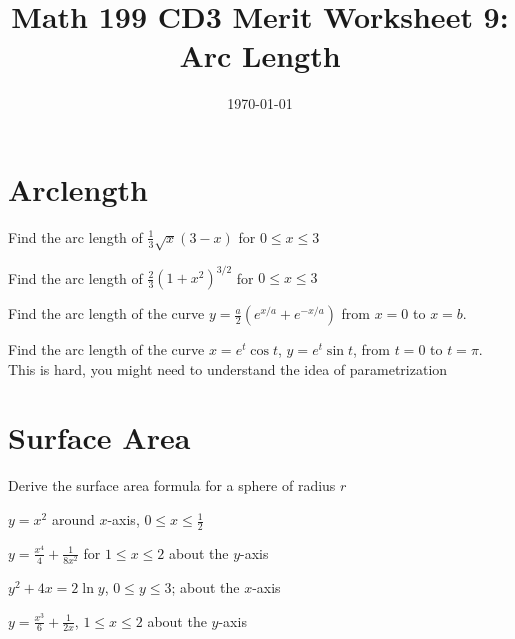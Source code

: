 
\usepackage{fullpage,amsmath,amssymb,amsthm}

\newcommand{\D}{\displaystyle}

\title{Math 199 CD3 Merit Worksheet 9: Arc Length}
\date{\today}




\maketitle
\section{Arclength}
\be
	\item Find the arc length of $\frac{1}{3}\sqrt{x}(3-x)$ for $0\leq x\leq 3$
	\vfill
	\item Find the arc length of $\frac{2}{3}(1+x^2)^{3/2}$ for $0\leq x\leq 3$
	\vfill
	\item Find the arc length of the curve $y=\frac{a}{2}(e^{x/a}+e^{-x/a})$ from $x=0$ to $x=b$.
	\vfill
	\item Find the arc length of the curve $x=e^t\cos t$, $y=e^t\sin t$, from $t=0$ to $t= \pi$. This is hard, you might need to understand the idea of parametrization
	\vfill
	\newpage

\section{Surface Area}
	\item Derive the surface area formula for a sphere of radius $r$
	\vfill
	\item $y=x^2$ around $x$-axis, $0\leq x\leq \frac{1}{2}$
	\vfill
	\item $y=\frac{x^4}{4}+\frac{1}{8x^2}$ for $1\leq x\leq 2$ about the $y$-axis
	\vfill
	\item $y^2+4x=2 \ln y$, $0 \leq y\leq 3$; about the $x$-axis
	\vfill
	\item $y=\frac{x^3}{6}+\frac{1}{2x}$, $1 \leq x\leq 2$ about the $y$-axis
	\vfill


\ee

